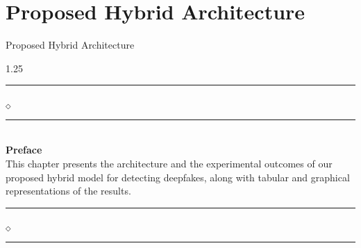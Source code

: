 \chapter[Proposed Hybrid Architecture]{Proposed Hybrid Architecture}{Proposed Hybrid Architecture}\label{Proposed_Work}


\begin{spacing}{1.25}
\vskip 20pt
\noindent
\rule{0.49\textwidth}{0.75pt} $_{\Diamond}$ \rule{0.49\textwidth}{0.75pt}\\
{\Large{\textbf{Preface}}}\\
This chapter presents the architecture and the experimental outcomes of our proposed hybrid model for detecting deepfakes, along with tabular and graphical representations of the results.\\
\rule{0.49\textwidth}{0.75pt} $_{\Diamond}$ \rule{0.49\textwidth}{0.75pt}
\end{spacing}
\newpage







